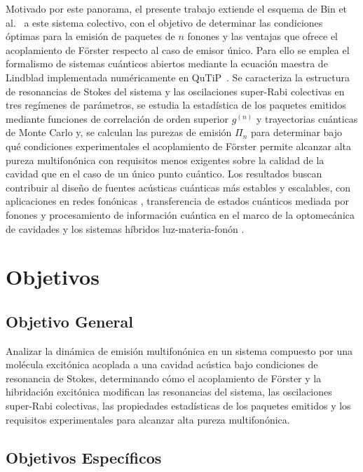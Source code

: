 Motivado por este panorama, el presente trabajo extiende el esquema de Bin et al.~\cite{bin2020} a este sistema colectivo, con el objetivo de determinar las condiciones óptimas para la emisión de paquetes de $n$ fonones y las ventajas que ofrece el acoplamiento de Förster respecto al caso de emisor único. Para ello se emplea el formalismo de sistemas cuánticos abiertos mediante la ecuación maestra de Lindblad implementada numéricamente en QuTiP~\cite{johansson2011}. Se caracteriza la estructura de resonancias de Stokes del sistema y las oscilaciones super-Rabi colectivas en tres regímenes de parámetros, se estudia la estadística de los paquetes emitidos mediante funciones de correlación de orden superior $g^{(n)}$ y trayectorias cuánticas de Monte Carlo y, se calculan las purezas de emisión $\Pi_n$ \cite{munoz2018} para determinar bajo qué condiciones experimentales el acoplamiento de Förster permite alcanzar alta pureza multifonónica con requisitos menos exigentes sobre la calidad de la cavidad que en el caso de un único punto cuántico. Los resultados buscan contribuir al diseño de fuentes acústicas cuánticas más estables y escalables, con aplicaciones en redes fonónicas \cite{habraken2012}, transferencia de estados cuánticos mediada por fonones \cite{bienfait2019} y procesamiento de información cuántica en el marco de la optomecánica de cavidades y los sistemas híbridos luz-materia-fonón \cite{aspelmeyer2014}.

\section{Objetivos}

\subsection*{Objetivo General}

Analizar la dinámica de emisión multifonónica en un sistema compuesto por una molécula excitónica acoplada a una cavidad acústica bajo condiciones de resonancia de Stokes, determinando cómo el acoplamiento de Förster y la hibridación excitónica modifican las resonancias del sistema, las oscilaciones super-Rabi colectivas, las propiedades estadísticas de los paquetes emitidos y los requisitos experimentales para alcanzar alta pureza multifonónica.

\subsection*{Objetivos Específicos}

